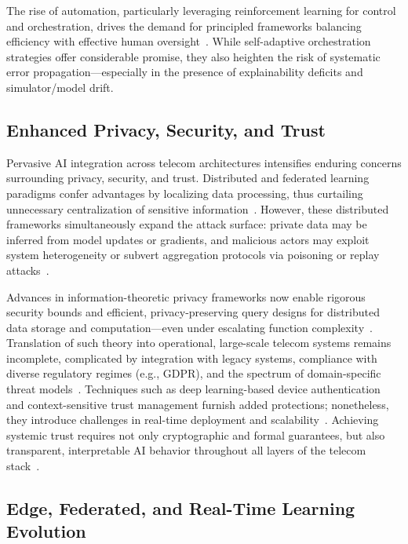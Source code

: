 \documentclass[sigconf]{acmart}
\begin{document}
The rise of automation, particularly leveraging reinforcement learning for control and orchestration, drives the demand for principled frameworks balancing efficiency with effective human oversight~\cite{ref37}. While self-adaptive orchestration strategies offer considerable promise, they also heighten the risk of systematic error propagation—especially in the presence of explainability deficits and simulator/model drift.

\subsection{Enhanced Privacy, Security, and Trust}

Pervasive AI integration across telecom architectures intensifies enduring concerns surrounding privacy, security, and trust. Distributed and federated learning paradigms confer advantages by localizing data processing, thus curtailing unnecessary centralization of sensitive information~\cite{ref17,ref18,ref19,ref23,ref24,ref26,ref48}. However, these distributed frameworks simultaneously expand the attack surface: private data may be inferred from model updates or gradients, and malicious actors may exploit system heterogeneity or subvert aggregation protocols via poisoning or replay attacks~\cite{ref10,ref20,ref21,ref23}.

Advances in information-theoretic privacy frameworks now enable rigorous security bounds and efficient, privacy-preserving query designs for distributed data storage and computation—even under escalating function complexity~\cite{ref48}. Translation of such theory into operational, large-scale telecom systems remains incomplete, complicated by integration with legacy systems, compliance with diverse regulatory regimes (e.g., GDPR), and the spectrum of domain-specific threat models~\cite{ref10,ref24,ref49}. Techniques such as deep learning-based device authentication and context-sensitive trust management furnish added protections; nonetheless, they introduce challenges in real-time deployment and scalability~\cite{ref18,ref23}. Achieving systemic trust requires not only cryptographic and formal guarantees, but also transparent, interpretable AI behavior throughout all layers of the telecom stack~\cite{ref19,ref26,ref49}.

\subsection{Edge, Federated, and Real-Time Learning Evolution}
\end{document}
